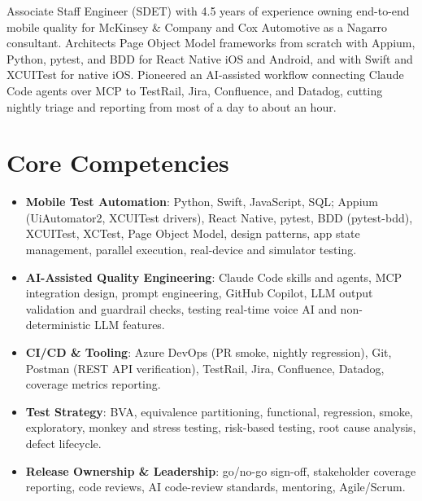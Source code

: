 \documentclass[11pt,a4paper,sans]{moderncv}
\begin{document}
\makecvtitle


\vspace{6pt}
\small{Associate Staff Engineer (SDET) with 4.5 years of experience owning end-to-end mobile quality for McKinsey \& Company and Cox Automotive as a Nagarro consultant. Architects Page Object Model frameworks from scratch with Appium, Python, pytest, and BDD for React Native iOS and Android, and with Swift and XCUITest for native iOS. Pioneered an AI-assisted workflow connecting Claude Code agents over MCP to TestRail, Jira, Confluence, and Datadog, cutting nightly triage and reporting from most of a day to about an hour.}


\section{Core Competencies}
\vspace{1pt}
\begin{itemize}

\item \textbf{Mobile Test Automation}: Python, Swift, JavaScript, SQL; Appium (UiAutomator2, XCUITest drivers), React Native, pytest, BDD (pytest-bdd), XCUITest, XCTest, Page Object Model, design patterns, app state management, parallel execution, real-device and simulator testing.

\item \textbf{AI-Assisted Quality Engineering}: Claude Code skills and agents, MCP integration design, prompt engineering, GitHub Copilot, LLM output validation and guardrail checks, testing real-time voice AI and non-deterministic LLM features.

\item \textbf{CI/CD \& Tooling}: Azure DevOps (PR smoke, nightly regression), Git, Postman (REST API verification), TestRail, Jira, Confluence, Datadog, coverage metrics reporting.

\item \textbf{Test Strategy}: BVA, equivalence partitioning, functional, regression, smoke, exploratory, monkey and stress testing, risk-based testing, root cause analysis, defect lifecycle.

\item \textbf{Release Ownership \& Leadership}: go/no-go sign-off, stakeholder coverage reporting, code reviews, AI code-review standards, mentoring, Agile/Scrum.

\end{itemize}
\end{document}
